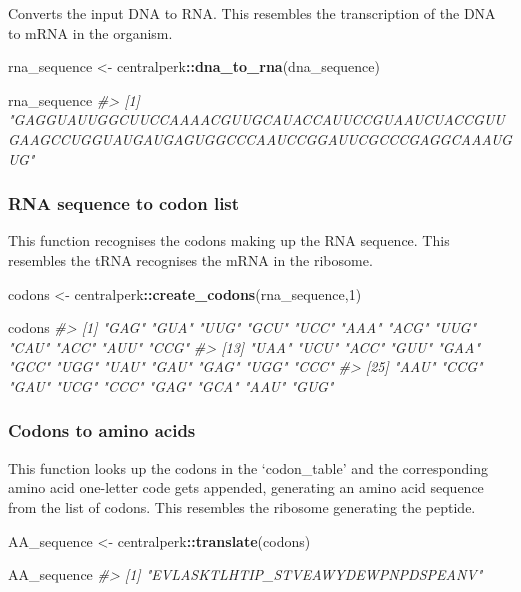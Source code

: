 \documentclass[
]{article}
\newenvironment{Shaded}{\begin{snugshade}}{\end{snugshade}}
\newcommand{\CommentTok}[1]{\textcolor[rgb]{0.56,0.35,0.01}{\textit{#1}}}
\newcommand{\DecValTok}[1]{\textcolor[rgb]{0.00,0.00,0.81}{#1}}
\newcommand{\FunctionTok}[1]{\textcolor[rgb]{0.13,0.29,0.53}{\textbf{#1}}}
\newcommand{\NormalTok}[1]{#1}
\newcommand{\OtherTok}[1]{\textcolor[rgb]{0.56,0.35,0.01}{#1}}
\newcommand{\SpecialCharTok}[1]{\textcolor[rgb]{0.81,0.36,0.00}{\textbf{#1}}}
\begin{document}
Converts the input DNA to RNA. This resembles the transcription of the
DNA to mRNA in the organism.

\begin{Shaded}
\begin{Highlighting}[]
\NormalTok{rna\_sequence }\OtherTok{\textless{}{-}}\NormalTok{ centralperk}\SpecialCharTok{::}\FunctionTok{dna\_to\_rna}\NormalTok{(dna\_sequence)}

\NormalTok{rna\_sequence}
\CommentTok{\#\textgreater{} [1] "GAGGUAUUGGCUUCCAAAACGUUGCAUACCAUUCCGUAAUCUACCGUUGAAGCCUGGUAUGAUGAGUGGCCCAAUCCGGAUUCGCCCGAGGCAAAUGUG"}
\end{Highlighting}
\end{Shaded}

\subsubsection{RNA sequence to codon
list}\label{rna-sequence-to-codon-list}

This function recognises the codons making up the RNA sequence. This
resembles the tRNA recognises the mRNA in the ribosome.

\begin{Shaded}
\begin{Highlighting}[]
\NormalTok{codons }\OtherTok{\textless{}{-}}\NormalTok{ centralperk}\SpecialCharTok{::}\FunctionTok{create\_codons}\NormalTok{(rna\_sequence,}\DecValTok{1}\NormalTok{)}

\NormalTok{codons}
\CommentTok{\#\textgreater{}  [1] "GAG" "GUA" "UUG" "GCU" "UCC" "AAA" "ACG" "UUG" "CAU" "ACC" "AUU" "CCG"}
\CommentTok{\#\textgreater{} [13] "UAA" "UCU" "ACC" "GUU" "GAA" "GCC" "UGG" "UAU" "GAU" "GAG" "UGG" "CCC"}
\CommentTok{\#\textgreater{} [25] "AAU" "CCG" "GAU" "UCG" "CCC" "GAG" "GCA" "AAU" "GUG"}
\end{Highlighting}
\end{Shaded}

\subsubsection{Codons to amino acids}\label{codons-to-amino-acids}

This function looks up the codons in the `codon\_table' and the
corresponding amino acid one-letter code gets appended, generating an
amino acid sequence from the list of codons. This resembles the ribosome
generating the peptide.

\begin{Shaded}
\begin{Highlighting}[]
\NormalTok{AA\_sequence }\OtherTok{\textless{}{-}}\NormalTok{ centralperk}\SpecialCharTok{::}\FunctionTok{translate}\NormalTok{(codons)}

\NormalTok{AA\_sequence}
\CommentTok{\#\textgreater{} [1] "EVLASKTLHTIP\_STVEAWYDEWPNPDSPEANV"}
\end{Highlighting}
\end{Shaded}
\end{document}
